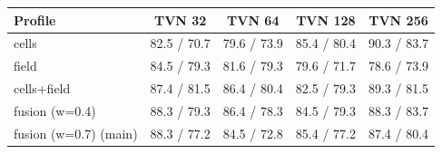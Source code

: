 \begin{tabular}{lcccc}
\toprule
Profile & TVN 32 & TVN 64 & TVN 128 & TVN 256 \\
\midrule
cells & 82.5 / 70.7 & 79.6 / 73.9 & 85.4 / 80.4 & 90.3 / 83.7 \\
field & 84.5 / 79.3 & 81.6 / 79.3 & 79.6 / 71.7 & 78.6 / 73.9 \\
cells+field & 87.4 / 81.5 & 86.4 / 80.4 & 82.5 / 79.3 & 89.3 / 81.5 \\
fusion (w=0.4) & 88.3 / 79.3 & 86.4 / 78.3 & 84.5 / 79.3 & 88.3 / 83.7 \\
fusion (w=0.7) (main) & 88.3 / 77.2 & 84.5 / 72.8 & 85.4 / 77.2 & 87.4 / 80.4 \\
\bottomrule
\end{tabular}
